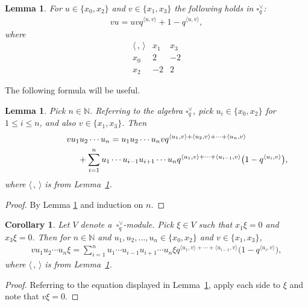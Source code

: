 \documentclass[11pt]{article}
\numberwithin{equation}{section}
\numberwithin{equation}{section}
\newtheorem{Corollary}[Theorem]{Corollary}
\newtheorem{Lemma}[Theorem]{Lemma}
\begin{document}
{\begin{Lemma} \label{lem:unif}For $u \in \lbrace x_0, x_2\rbrace$ and $v \in \lbrace x_1, x_3\rbrace$ the following holds in $\square^\vee_q$:
\begin{gather*}
v u = uv q^{\langle u,v\rangle} + 1-q^{\langle u,v\rangle},
\end{gather*}
where
\[
\begin{array}{c|cc}
\langle\,,\,\rangle & x_1 & x_3 \\ \hline
x_0 &2 & -2 \\
x_2 & -2 & 2
 \end{array}
\]
\end{Lemma}

The following formula will be useful.
\begin{Lemma}\label{lem:formula}Pick $n \in \mathbb N$. Referring to the algebra $\square^\vee_q$, pick
$u_i\in\lbrace x_0, x_2\rbrace$ for $1 \leq i \leq n$, and also $v \in \lbrace x_1, x_3\rbrace $. Then
\begin{gather*}
v u_1u_2\cdots u_n = u_1 u_2 \cdots u_n v q^{ \langle u_1,v\rangle+\langle u_2,v\rangle+\cdots+
\langle u_n,v\rangle}\\
\hphantom{v u_1u_2\cdots u_n =}{} + \sum_{i=1}^n u_1\cdots u_{i-1} u_{i+1} \cdots u_n
q^{\langle u_1,v\rangle+\cdots + \langle u_{i-1},v\rangle}\big(1-q^{\langle u_i,v\rangle}\big),
\end{gather*}
where $\langle \,,\,\rangle$ is from Lemma~{\rm \ref{lem:unif}}.
\end{Lemma}
\begin{proof} By Lemma \ref{lem:unif} and induction on $n$.
\end{proof}

\begin{Corollary}\label{cor:modW}Let $V$ denote a~$\square^\vee_q$-module. Pick $\xi \in V$ such that $x_1 \xi = 0$ and $x_3 \xi = 0$. Then for $n \in \mathbb N$ and $u_1, u_2, \ldots, u_n \in\lbrace x_0, x_2\rbrace$ and $v \in \lbrace x_1, x_3\rbrace $,
\begin{gather*}
 v u_1u_2\cdots u_n \xi =\sum_{i=1}^n u_1\cdots u_{i-1} u_{i+1} \cdots u_n \xi
q^{\langle u_1,v\rangle+\cdots + \langle u_{i-1},v\rangle}\big(1-q^{\langle u_i,v\rangle}\big),
\end{gather*}
where $\langle \,,\,\rangle$ is from Lemma~{\rm \ref{lem:unif}}.
\end{Corollary}
\begin{proof} Referring to the equation displayed in Lemma~\ref{lem:formula}, apply each side to $\xi$ and note that $v\xi =0$.
\end{proof}

}
\end{document}
